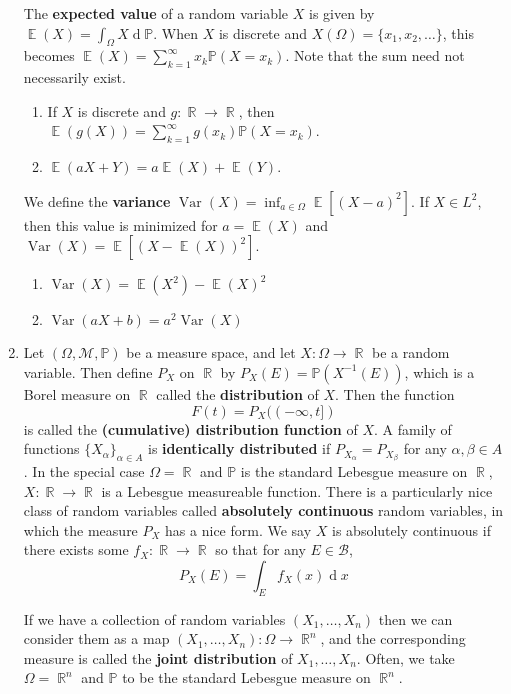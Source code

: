 \documentclass[12pt, a4paper]{article}
\DeclareMathOperator{\R}{\mathbb{R}}
\DeclareMathOperator{\E}{\mathbb{E}}
\DeclareMathOperator{\Var}{Var}
\renewcommand{\Pr}{\mathbb{P}}
\renewcommand{\d}[1]{\ensuremath{\operatorname{d}\!{#1}}} %
\theoremstyle{nonumberplain}
\begin{document}
\begin{enumerate}
        The \textbf{expected value} of a random variable $X$ is given by $\E(X)=\int_\Omega X\d{\Pr}$.
        When $X$ is discrete and $X(\Omega)=\{x_1,x_2,\ldots\}$, this becomes $\E(X)=\sum\limits_{k=1}^\infty x_k\Pr(X=x_k)$.
        Note that the sum need not necessarily exist.
        \begin{enumerate}
            \item If $X$ is discrete and $g:\R\to\R$, then $\E(g(X))=\sum\limits_{k=1}^\infty g(x_k)\Pr(X=x_k)$.
            \item $\E(aX+Y)=a\E(X)+\E(Y)$.
        \end{enumerate}
        We define the \textbf{variance} $\Var(X)=\inf_{a\in\Omega}\E[(X-a)^2]$.
        If $X\in L^2$, then this value is minimized for $a=\E(X)$ and $\Var(X)=\E[(X-\E(X))^2]$.
        \begin{enumerate}
            \item $\Var(X)=\E(X^2)-\E(X)^2$
            \item $\Var(aX+b)=a^2\Var(X)$
        \end{enumerate}
    \item Let $(\Omega,\mathcal{M},\Pr)$ be a measure space, and let $X:\Omega\to\R$ be a random variable.
        Then define $P_X$ on $\R$ by $P_X(E)=\Pr(X^{-1}(E))$, which is a Borel measure on $\R$ called the \textbf{distribution} of $X$.
        Then the function
        \[F(t)=P_X((-\infty,t])\] %
        is called the \textbf{(cumulative) distribution function} of $X$.
        A family of functions $\{X_\alpha\}_{\alpha\in A}$ is \textbf{identically distributed} if $P_{X_\alpha}=P_{X_\beta}$ for any $\alpha,\beta\in A$.
        In the special case $\Omega=\R$ and $\Pr$ is the standard Lebesgue measure on $\R$, $X:\R\to\R$ is a Lebesgue measureable function.
        There is a particularly nice class of random variables called \textbf{absolutely continuous} random variables, in which the measure $P_X$ has a nice form.
        We say $X$ is absolutely continuous if there exists some $f_X:\R\to\R$ so that for any $E\in\mathcal{B}$,
        \[P_X(E)=\int_E f_X(x)\d{x}\]


        If we have a collection of random variables $(X_1,\ldots,X_n)$ then we can consider them as a map $(X_1,\ldots,X_n):\Omega\to\R^n$, and the corresponding measure is called the \textbf{joint distribution} of $X_1,\ldots,X_n$.
        Often, we take $\Omega=\R^n$ and $\Pr$ to be the standard Lebesgue measure on $\R^n$.
\end{enumerate}
\end{document}
